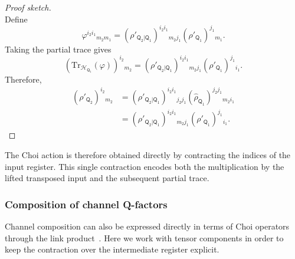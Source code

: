 \documentclass[
    aps,
    pra,
    reprint,
    superscriptaddress,
    nofootinbib
]{revtex4-2}
\theoremstyle{definition}
\theoremstyle{plain}
\begin{document}
\begin{proof}[Proof sketch]
\begin{equation}
        \end{equation}
        Define
        \begin{equation}
            \varphi^{i_{2}i_{1}}{}_{m_{2}m_{1}}
            =
            (\rho'_{\mathsf{Q}_{2}|\mathsf{Q}_{1}})
            ^{i_{2}i_{1}}{}_{m_{2}j_{1}}
            (\rho'_{\mathsf{Q}_{1}})^{j_{1}}{}_{m_{1}}.
        \end{equation}
        Taking the partial trace gives
        \begin{equation}
            \left(
                \mathrm{Tr}_{\mathcal{H}_{\mathsf{Q}_{1}}}
                (\varphi)
            \right)^{i_{2}}{}_{m_{2}}
            =
            (\rho'_{\mathsf{Q}_{2}|\mathsf{Q}_{1}})
            ^{i_{2}i_{1}}{}_{m_{2}j_{1}}
            (\rho'_{\mathsf{Q}_{1}})^{j_{1}}{}_{i_{1}}.
        \end{equation}
        Therefore,
        \begin{equation}
            \begin{aligned}
            (\rho'_{\mathsf{Q}_{2}})^{i_{2}}{}_{m_{2}}
            &=
            (\rho'_{\mathsf{Q}_{2}|\mathsf{Q}_{1}})
            ^{i_{2}i_{1}}{}_{j_{2}j_{1}}
            (\hat{\rho}_{\mathsf{Q}_{1}})
            ^{j_{2}j_{1}}{}_{m_{2}i_{1}}\\
            &=
            (\rho'_{\mathsf{Q}_{2}|\mathsf{Q}_{1}})
            ^{i_{2}i_{1}}{}_{m_{2}j_{1}}
            (\rho'_{\mathsf{Q}_{1}})^{j_{1}}{}_{i_{1}}.
            \end{aligned}
        \end{equation}
\end{proof}

The Choi action is therefore obtained directly by contracting the indices of
the input register. This single contraction encodes both the multiplication
by the lifted transposed input and the subsequent partial trace.

\subsubsection{Composition of channel Q-factors}
\label{subsubsec:pqf}

Channel composition can also be expressed directly in terms of Choi
operators through the link product~\cite{ChiribellaDArianoPerinotti2009}.
Here we work with tensor components in order to keep the contraction over
the intermediate register explicit.
\end{document}
